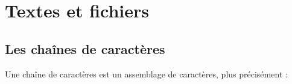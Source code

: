 \chapter{Textes et fichiers}
\thispagestyle{empty}
\section{Les chaînes de caractères}
Une chaîne de caractères est un assemblage de caractères, plus précisément : 

